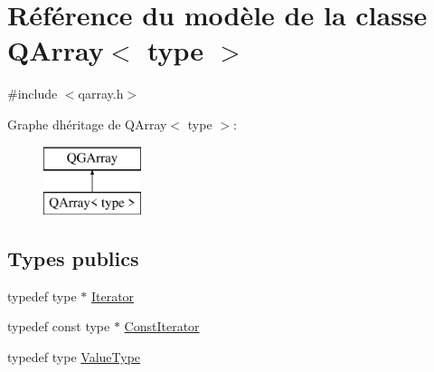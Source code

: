 \hypertarget{class_q_array}{}\section{Référence du modèle de la classe Q\+Array$<$ type $>$}
\label{class_q_array}


{\ttfamily \#include $<$qarray.\+h$>$}

Graphe d\textquotesingle{}héritage de Q\+Array$<$ type $>$\+:\begin{figure}[H]
\begin{center}
\leavevmode
\includegraphics[height=2.000000cm]{class_q_array}
\end{center}
\end{figure}
\subsection*{Types publics}
\begin{DoxyCompactItemize}
\item 
typedef type $\ast$ \hyperlink{class_q_array_a34cdd5c57d2deab1dfd53e0d46e78cee}{Iterator}
\item 
typedef const type $\ast$ \hyperlink{class_q_array_a1bb994357ffeb855b3f19f6562137f93}{Const\+Iterator}
\item 
typedef type \hyperlink{class_q_array_a8360acb482596a511681e8dd1eadd0f0}{Value\+Type}
\end{DoxyCompactItemize}

